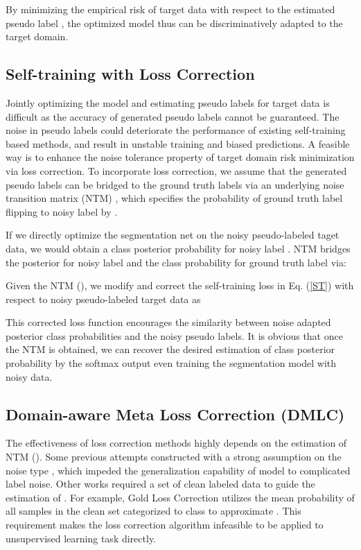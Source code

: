 \documentclass[final]{cvpr}
\begin{document}
By minimizing the empirical risk of target data with respect to the estimated pseudo label , the optimized model thus can be discriminatively adapted to the target domain.

\subsection{Self-training with Loss Correction} 
Jointly optimizing the model and estimating pseudo labels for target data is difficult as the accuracy of generated pseudo labels cannot be guaranteed. The noise in pseudo labels could deteriorate the performance of existing self-training based methods, and result in unstable training and biased predictions. A feasible way is to enhance the noise tolerance property of target domain risk minimization via loss correction. To incorporate loss correction, we assume that the generated pseudo labels  can be bridged to the ground truth labels   via an underlying noise transition matrix (NTM) , which specifies the probability of ground truth label  flipping to noisy label  by . 

If we directly optimize the segmentation net  on the noisy pseudo-labeled taget data, we would obtain a class posterior probability for noisy label . NTM bridges the posterior for noisy label  and the class probability for ground truth label via: 
\vspace{-0.2cm}

Given the NTM (), we modify and correct the self-training loss  in Eq. (\ref{ST}) with respect to noisy pseudo-labeled target data as 


This corrected loss function encourages the similarity between noise adapted posterior class probabilities and the noisy pseudo labels. It is obvious that once the NTM is obtained, we can recover the desired estimation of class posterior probability  by the softmax output  even training the segmentation model with noisy data. 

\subsection{Domain-aware Meta Loss Correction (DMLC)} 
The effectiveness of loss correction methods highly depends on the estimation of NTM (). Some previous attempts constructed  with a strong assumption on the noise type \cite{hendrycks2018using, patrini2017making}, which impeded the generalization capability of model to complicated label noise. Other works required a set of clean labeled data to guide the estimation of  \cite{hendrycks2018using, shu2020meta, wang2020training}. For example, Gold Loss Correction \cite{hendrycks2018using} utilizes the mean probability of all samples in the clean set categorized to class  to approximate . This requirement makes the loss correction algorithm infeasible to be applied to unsupervised learning task directly. 
\end{document}
